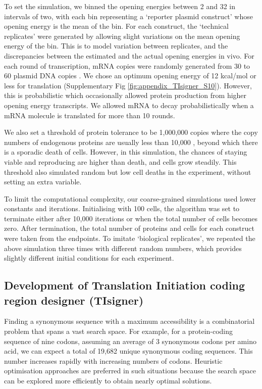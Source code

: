 To set the simulation, we binned the opening energies between 2 and 32 in intervals of two, with each bin representing a ‘reporter plasmid construct’ whose opening energy is the mean of the bin. For each construct, the ‘technical replicates’ were generated by allowing slight variations on the mean opening energy of the bin. This is to model variation between replicates, and the discrepancies between the estimated and the actual opening energies in vivo. For each round of transcription, mRNA copies were randomly generated from 30 to 60 plasmid DNA copies \cite{Held2003-ts,Gomes2020-ek,Rosano2014-oq}. We chose an optimum opening energy of 12 kcal/mol or less for translation (Supplementary Fig \ref{fig:appendix_TIsigner_S10}). However, this is probabilistic which occasionally allowed protein production from higher opening energy transcripts. We allowed mRNA to decay probabilistically when a mRNA molecule is translated for more than 10 rounds.

We also set a threshold of protein tolerance to be 1,000,000 copies where the copy numbers of endogenous proteins are usually less than 10,000 \cite{Taniguchi2010-uq}, beyond which there is a sporadic death of cells. However, in this simulation, the chances of staying viable and reproducing are higher than death, and cells grow steadily. This threshold also simulated random but low cell deaths in the experiment, without setting an extra variable.

To limit the computational complexity, our coarse-grained simulations used lower constants and iterations. Initialising with 100 cells, the algorithm was set to terminate either after 10,000 iterations or when the total number of  cells becomes zero. After termination, the total number of proteins and cells for each construct were taken from the endpoints. To imitate ‘biological replicates’, we repeated the above simulation three times with different random numbers, which provides slightly different initial conditions for each experiment.

\subsection{Development of Translation Initiation coding region designer (TIsigner)}
Finding a synonymous sequence with a maximum accessibility is a combinatorial problem that spans a vast search space. For example, for a protein-coding sequence of nine codons, assuming an average of 3 synonymous codons per amino acid, we can expect a total of 19,682 unique synonymous coding sequences. This number increases rapidly with increasing numbers of codons. Heuristic optimisation approaches are preferred in such situations because the search space can be explored more efficiently to obtain nearly optimal solutions. 

